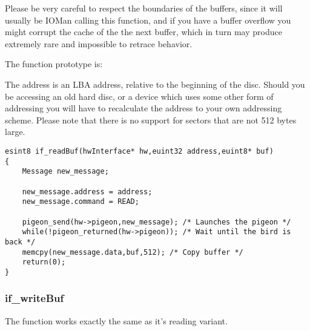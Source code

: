 Please be very careful to respect the boundaries of the buffers, since it will usually be IOMan
calling this function, and if you have a buffer overflow you might corrupt the cache of the
the next buffer, which in turn may produce extremely rare and impossible to retrace behavior.

The function prototype is:\\

The address is an LBA address, relative to the beginning of the disc. Should you be
accessing an old hard disc, or a device which uses some other form of addressing you will have to
recalculate the address to your own addressing scheme. Please note that there is no support
for sectors that are not 512 bytes large.

\begin{lstlisting}
esint8 if_readBuf(hwInterface* hw,euint32 address,euint8* buf)
{
	Message new_message;

	new_message.address = address;
	new_message.command = READ;

	pigeon_send(hw->pigeon,new_message); /* Launches the pigeon */
	while(!pigeon_returned(hw->pigeon)); /* Wait until the bird is back */
	memcpy(new_message.data,buf,512); /* Copy buffer */
	return(0);
}
\end{lstlisting}

\subsubsection{if\_writeBuf}
The function  works exactly the same as it's reading variant.
